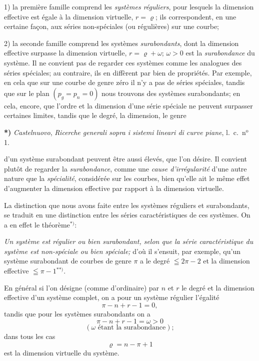 \documentclass{article}
\begin{document}
1) la première famille comprend les \emph{systèmes réguliers}, pour lesquels la dimension effective est égale à la dimension virtuelle, $r = \varrho$; ils correspondent, en une certaine façon, aux séries non-spéciales (ou régulières) sur une courbe;

2) la seconde famille comprend les systèmes \emph{surabondants}, dont la dimension effective surpasse la dimension virtuelle, $r = \varrho + \omega$; $\omega > 0$ est la \emph{surabondance} du système. Il ne convient pas de regarder ces systèmes comme les analogues des séries spéciales; au contraire, ils en diffèrent par bien de propriétés. Par exemple, en cela que sur une courbe de genre zéro il n'y a pas de séries spéciales, tandis que sur le plan $(p_{g} = p_{n} = 0)$ nous trouvons des systèmes surabondants; en cela, encore, que l'ordre et la dimension d'une série spéciale ne peuvent surpasser certaines limites, tandis que le degré, la dimension, le genre

\textbf{*)} \emph{Castelnuovo}, \emph{Ricerche generali sopra i sistemi lineari di curve piane}, l.\ c.\ n${}^{\text{o}}$ 1.

d'un système surabondant peuvent être aussi élevés, que l'on désire. Il convient plutôt de regarder la \emph{surabondance}, comme une \emph{cause d'irrégularité} d'une autre nature que la \emph{spécialité}, considérée sur les courbes, bien qu'elle ait le même effet d'augmenter la dimension effective par rapport à la dimension virtuelle.

La distinction que nous avons faite entre les systèmes réguliers et surabondants, se traduit en une distinction entre les séries caractéristiques de ces systèmes. On a en effet le théorème${}^{*)}$:

\emph{Un système est régulier ou bien surabondant, selon que la série caractéristique du système est non-spéciale ou bien spéciale;} d'où il s'ensuit, par exemple, qu'un système surabondant de courbes de genre $\pi$ a le degré $\leqq 2\pi - 2$ et la dimension effective $\leqq \pi - 1$${}^{**)}$.

En général si l'on désigne (comme d'ordinaire) par $n$ et $r$ le degré et la dimension effective d'un système complet, on a pour un système régulier l'égalité
\[ \pi - n + r - 1 = 0, \tag{1} \]
tandis que pour les systèmes surabondants on a
\[ \pi - n + r - 1 = \omega > 0 \tag{2} \]
\[ (\omega \text{ étant la surabondance}); \]
dans tous les cas
\[ \varrho = n - \pi + 1 \tag{3} \]
est la dimension virtuelle du système.
\end{document}
